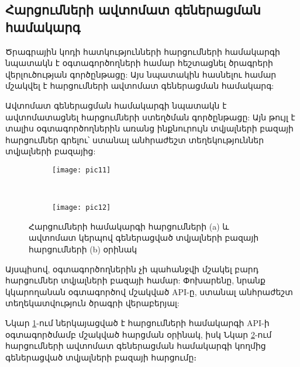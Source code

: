 {
    \subsection{Հարցումների ավտոմատ գեներացման համակարգ}\label{subsec:queryAggregation}
    Ծրագրային կոդի հատկությունների հարցումների համակարգի նպատակն է օգտագործողների համար հեշտացնել ծրագրերի վերլուծության
    գործընթացը: Այս նպատակին հասնելու համար մշակվել է հարցումների ավտոմատ գեներացման համակարգ:

    Ավտոմատ գեներացման համակարգի նպատակն է ավտոմատացնել հարցումների ստեղծման գործընթացը:
    Այն թույլ է տալիս օգտագործողներին առանց
    ինքնուրույն տվյալների բազայի հարցումներ գրելու՝ ստանալ անհրաժեշտ տեղեկություններ տվյալների բազայից:

    \begin{figure*}[t!]
        \centering
        \begin{subfigure}[t]{0.3\textwidth}
            \centering
            \texttt{[image: pic11]}
            \caption{}
            \label{fig:sub1}
        \end{subfigure}%
        ~
        \begin{subfigure}[t]{0.8\textwidth}
            \centering
            \texttt{[image: pic12]}
            \caption{}
            \label{fig:sub2}
        \end{subfigure}
        \caption{Հարցումների համակարգի հարցումների (a) և ավտոմատ կերպով գեներացված տվյալների բազայի հարցումների (b) օրինակ}
        \label{fig:figure11}
    \end{figure*}

    Այսպիսով, օգտագործողներին չի պահանջվի մշակել բարդ հարցումներ տվյալների բազայի համար:
    Փոխարենը, նրանք կկարողանան օգտագործով մշակված API-ը, ստանալ անհրաժեշտ տեղեկատվություն ծրագրի վերաբերյալ:

    Նկար \ref{fig:sub1}-ում ներկայացված է հարցումների համակարգի API-ի օգտագործմամբ մշակված հարցման օրինակ,
    իսկ Նկար \ref{fig:sub2}-ում հարցումների ավտոմատ գեներացման համակարգի կողմից գեներացված տվյալների բազայի հարցումը։
}